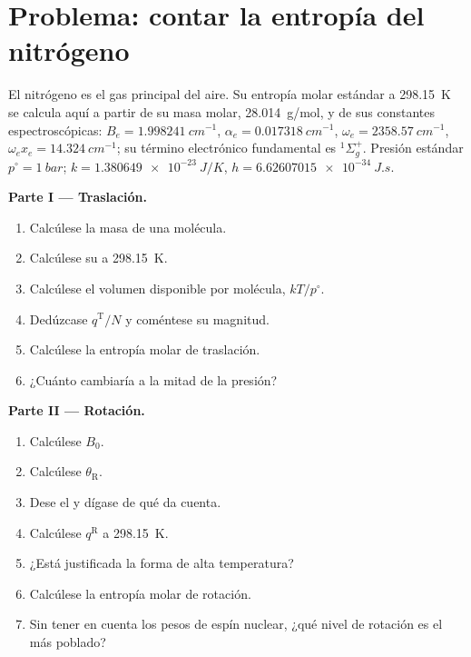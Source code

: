 \section{Problema: contar la entropía del nitrógeno}

\begin{problem}
\label{pb:b3:partition-functions:1}
El nitrógeno es el gas principal del aire. Su entropía molar estándar a
\qty{298.15}{K} se calcula aquí a partir de su masa molar, \qty{28.014}{g/mol}, y de sus
constantes espectroscópicas: $B_e = \qty{1.998241}{cm^{-1}}$, $\alpha_e = \qty{0.017318}{cm^{-1}}$, $\omega_e =
\qty{2358.57}{cm^{-1}}$, $\omega_ex_e = \qty{14.324}{cm^{-1}}$; su término electrónico fundamental es ${}^1\Sigma_g^+$.
Presión estándar $p^\circ = \qty{1}{bar}$; $k = \qty{1.380649e-23}{J/K}$, $h = \qty{6.62607015e-34}{J.s}$.

\medskip\noindent\textbf{Parte I --- Traslación.}
\begin{enumerate}
  \item Calcúlese la masa de una molécula.
  \item Calcúlese su  a \qty{298.15}{K}.
  \item Calcúlese el volumen disponible por molécula, $kT/p^\circ$.
  \item Dedúzcase $q^{\mathrm T}/N$ y coméntese su magnitud.
  \item Calcúlese la entropía molar de traslación.
  \item ¿Cuánto cambiaría a la mitad de la presión?
\end{enumerate}

\medskip\noindent\textbf{Parte II --- Rotación.}
\begin{enumerate}[resume]
  \item Calcúlese $B_0$.
  \item Calcúlese $\theta_{\mathrm R}$.
  \item Dese el  y dígase de qué da cuenta.
  \item Calcúlese $q^{\mathrm R}$ a \qty{298.15}{K}.
  \item ¿Está justificada la forma de alta temperatura?
  \item Calcúlese la entropía molar de rotación.
  \item Sin tener en cuenta los pesos de espín nuclear, ¿qué nivel de rotación es el más
        poblado?
\end{enumerate}


\end{problem}
